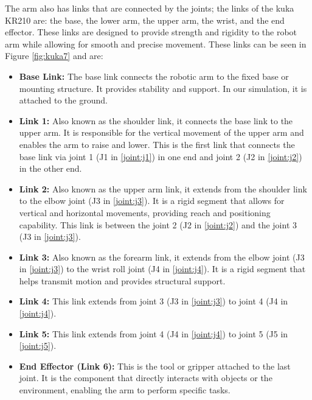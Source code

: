 \documentclass[12pt,oneside]{article}
\begin{document}
The arm also has links that are connected by the joints; the links of the kuka KR210 are: the base, the lower arm, the upper arm, the wrist, and the end effector. These links are designed to provide strength and rigidity to the robot arm while allowing for smooth and precise movement. These links can be seen in Figure \ref{fig:kuka7} and are:

\begin{itemize}
	\item \textbf{Base Link:} The base link connects the robotic arm to the fixed base or mounting structure. It provides stability and support. In our simulation, it is attached to the ground.
	
	\item \textbf{Link 1:} Also known as the shoulder link, it connects the base link to the upper arm. It is responsible for the vertical movement of the upper arm and enables the arm to raise and lower. This is the first link that connects the base link via joint 1 (J1 in \ref{joint:j1}) in one end and joint 2 (J2 in \ref{joint:j2}) in the other end.
	
	\item \textbf{Link 2:} Also known as the upper arm link, it extends from the shoulder link to the elbow joint (J3 in \ref{joint:j3}). It is a rigid segment that allows for vertical and horizontal movements, providing reach and positioning capability. This link is between the joint 2 (J2 in \ref{joint:j2}) and the joint 3 (J3 in \ref{joint:j3}).
	
	\item \textbf{Link 3:} Also known as the forearm link, it extends from the elbow joint (J3 in \ref{joint:j3}) to the wrist roll joint (J4 in \ref{joint:j4}). It is a rigid segment that helps transmit motion and provides structural support.
	
	\item \textbf{Link 4: }This link extends from joint 3 (J3 in \ref{joint:j3}) to joint 4 (J4 in \ref{joint:j4}).
	
	\item \textbf{Link 5: }This link extends from joint 4 (J4 in \ref{joint:j4}) to joint 5 (J5 in \ref{joint:j5}).
	
	\item \textbf{End Effector (Link 6):} This is the tool or gripper attached to the last joint. It is the component that directly interacts with objects or the environment, enabling the arm to perform specific tasks.
	
\end{itemize}
\end{document}
